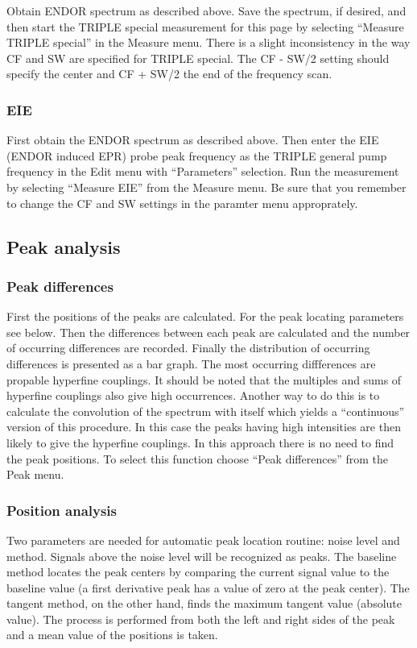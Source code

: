 \documentclass[byrevtex,amssymb,aps,pra,floatfix,letterpaper]{revtex4}
\begin{document}
Obtain ENDOR spectrum as described above. Save the spectrum, if desired, and then start the TRIPLE special measurement for this page by selecting ``Measure TRIPLE special'' in the Measure menu. There is a slight inconsistency in the way CF and SW are specified for TRIPLE special. The CF - SW/2 setting should specify the center and CF + SW/2 the end of the frequency scan.

\subsubsection{EIE}

First obtain the ENDOR spectrum as described above. Then enter the EIE (ENDOR induced EPR) probe peak frequency as the TRIPLE general pump frequency in the Edit menu with ``Parameters'' selection. Run the measurement by selecting ``Measure EIE'' from the Measure menu. Be sure that you remember to change the CF and SW settings in the paramter menu approprately.

\subsection{Peak analysis}

\subsubsection{Peak differences}

First the positions of the peaks are calculated. For the peak locating parameters see below. Then the differences between each peak are calculated and the number of occurring differences are recorded. Finally the distribution of occurring differences is presented as a bar graph. The most occurring diffferences are propable hyperfine couplings. It should be noted that the multiples and sums of hyperfine couplings also give high occurrences. Another way to do this is to calculate the convolution of the spectrum with itself which yields a ``continuous'' version of this procedure. In this case the peaks having high intensities are then likely to give the hyperfine couplings. In this approach there is no need to find the peak positions. To select this function choose ``Peak differences'' from the Peak menu.

\subsubsection{Position analysis}

Two parameters are needed for automatic peak location routine: noise level and method. Signals above the noise level will be recognized as peaks. The baseline method locates the peak centers by comparing the current signal value to the baseline value (a first derivative peak has a value of zero at the peak center). The tangent method, on the other hand, finds the maximum tangent value (absolute value). The process is performed from both the left and right sides of the peak and a mean value of the positions is taken.
\end{document}
